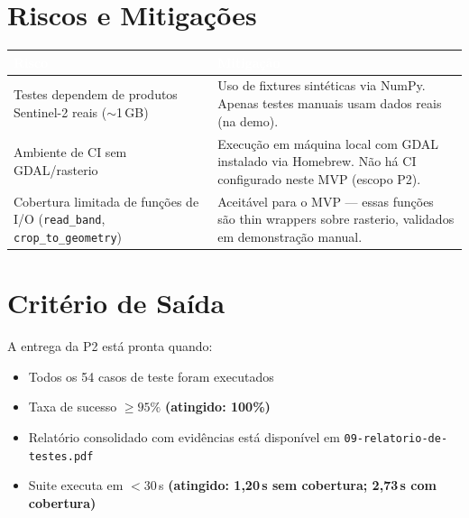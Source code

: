 \documentclass[11pt, a4paper]{article}
\begin{document}
\section{Riscos e Mitigações}

\begin{table}[H]
\centering
\small
{}
\begin{tabularx}{\textwidth}{@{}XX@{}}
\toprule
\rowcolor{tabheader}\textcolor{white}{\textbf{Risco}} & \textcolor{white}{\textbf{Mitigação}}\\
\midrule
Testes dependem de produtos Sentinel-2 reais ($\sim$1\,GB) & Uso de fixtures sintéticas via NumPy. Apenas testes manuais usam dados reais (na demo).\\
Ambiente de CI sem GDAL/rasterio & Execução em máquina local com GDAL instalado via Homebrew. Não há CI configurado neste MVP (escopo P2).\\
Cobertura limitada de funções de I/O (\texttt{read\_band}, \texttt{crop\_to\_geometry}) & Aceitável para o MVP --- essas funções são thin wrappers sobre rasterio, validados em demonstração manual.\\
\bottomrule
\end{tabularx}
\end{table}

\section{Critério de Saída}

\begin{successbox}
A entrega da P2 está pronta quando:
\begin{itemize}
  \item[\checkmark] Todos os 54 casos de teste foram executados
  \item[\checkmark] Taxa de sucesso $\geq 95\%$ \textbf{(atingido: 100\%)}
  \item[\checkmark] Relatório consolidado com evidências está disponível em \texttt{09-relatorio-de-testes.pdf}
  \item[\checkmark] Suite executa em $< 30$\,s \textbf{(atingido: 1{,}20\,s sem cobertura; 2{,}73\,s com cobertura)}
\end{itemize}
\end{successbox}
\end{document}
